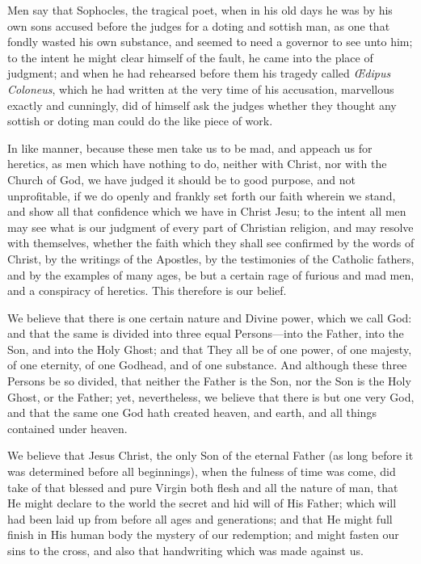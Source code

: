 Men say that Sophocles, the tragical poet, when in his old days he
was by his own sons accused before the judges for a doting and sottish
man, as one that fondly wasted his own substance, and seemed to need
a governor to see unto him; to the intent he might clear himself of
the fault, he came into the place of judgment; and when he had rehearsed
before them his tragedy called \emph{Œdipus Coloneus}, which he
had written at the very time of his accusation, marvellous exactly and
cunningly, did of himself ask the judges whether they thought any sottish
or doting man could do the like piece of work.

In like manner, because these men take us to be mad, and appeach
us for heretics, as men which have nothing to do, neither with Christ,
nor with the
Church of God, we have judged it should be to good purpose, and not
unprofitable, if we do openly and frankly set forth our faith wherein
we stand, and show all that confidence which we have in Christ Jesu;
to the intent all men may see what is our judgment of every part of
Christian religion, and may resolve with themselves, whether the faith
which they shall see confirmed by the words of Christ, by the writings
of the Apostles, by the testimonies of the Catholic fathers, and by
the examples of many ages, be but a certain rage of furious and mad
men, and a conspiracy of heretics. This therefore is our belief.


We believe that there is one certain nature and Divine power, which
we call God: and that the same is divided into three equal Persons—into
the Father, into the Son, and into the Holy Ghost; and that They all
be of one power, of one majesty, of one eternity, of one Godhead, and
of one substance. And although these three Persons be so divided,
that neither the Father is the Son, nor the Son is the Holy Ghost, or
the Father; yet, nevertheless, we believe that there is but one very
God, and
that the same one God hath created heaven, and earth, and all things
contained under heaven.

We believe that Jesus Christ, the only Son of the eternal Father
(as long before it was determined before all beginnings), when the fulness
of time was come, did take of that blessed and pure Virgin both flesh
and all the nature of man, that He might declare to the world the secret
and hid will of His Father; which will had been laid up from before
all ages and generations; and that He might full finish in His human
body the mystery of our redemption; and might fasten our sins to the
cross, and also that handwriting which was made against us.

